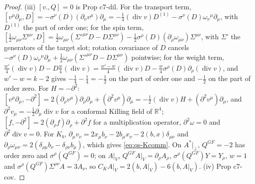 \documentclass[11pt]{article}
\numberwithin{equation}{section}
\theoremstyle{plain}
\theoremstyle{definition}
\newcommand{\AV}{A|_V}
\begin{document}
\begin{proof}
(iii) $[v.,Q]=0$ is Prop c7-dil. For the transport term, $[v^\mu\partial_\mu,D]=-\sigma^\nu(D)(\partial_\nu v^\mu)\partial_\mu=-\tfrac14(\operatorname{div}v)D^{(1)}-\sigma^\nu(D)\omega_\nu{}^\mu\partial_\mu$, with $D^{(1)}$ the part of order one; for the spin term, $[\tfrac12\omega_{\mu\nu}\Sigma^{\mu\nu},D]=\tfrac12\omega_{\mu\nu}(\Sigma'^{\mu\nu}D-D\Sigma^{\mu\nu})-\tfrac12\sigma^\rho(D)(\partial_\rho\omega_{\mu\nu})\Sigma^{\mu\nu}$, with $\Sigma'$ the generators of the target slot; rotation covariance of $D$ cancels $-\sigma^\nu(D)\omega_\nu{}^\mu\partial_\mu+\tfrac12\omega_{\mu\nu}(\Sigma'^{\mu\nu}D-D\Sigma^{\mu\nu})$ pointwise; for the weight term, $\tfrac{w'}4(\operatorname{div}v)D-D\tfrac w4(\operatorname{div}v)=\tfrac{w'-w}4(\operatorname{div}v)D-\tfrac w4\sigma^\rho(D)\partial_\rho(\operatorname{div}v)$, and $w'-w=k-2$ gives $-\tfrac14-\tfrac14=-\tfrac12$ on the part of order one and $-\tfrac12$ on the part of order zero. For $H=-\partial^2$: $[v^\mu\partial_\mu,-\partial^2]=2(\partial_\rho v^\mu)\partial_\rho\partial_\mu+(\partial^2v^\mu)\partial_\mu=-\tfrac12(\operatorname{div}v)H+(\partial^2v^\mu)\partial_\mu$, and $\partial^2v_\mu=-\tfrac12\partial_\mu\operatorname{div}v$ for a conformal Killing field of $\mathbb R^4$; $[f,-\partial^2]=2(\partial_\rho f)\partial_\rho+\partial^2f$ for a multiplication operator, $\partial^2\omega=0$ and $\partial^2\operatorname{div}v=0$. For $K_b$, $\partial_\mu v_\nu=2x_\mu b_\nu-2b_\mu x_\nu-2(b,x)\delta_{\mu\nu}$ and $\partial_\rho\omega_{\mu\nu}=2(\delta_{\rho\mu}b_\nu-\delta_{\rho\nu}b_\mu)$, which gives \eqref{eq:qs-Kcomm}. On $A^*|_\perp$, $Q^{GF}=-2$ has order zero and $\sigma^\rho(Q^{GF})=0$; on $\AV$, $Q^{GF}\AV=\partial_\rho A_\rho$, $\sigma^\rho(Q^{GF})Y=Y_\rho$, $w=1$ and $\sigma^\rho(Q^{GF})\Sigma^{\rho\nu}A=3A_\nu$, so $C_K\AV=2(b,\AV)-6(b,\AV)$. (iv) Prop c7-cov.
\end{proof}
\end{document}
